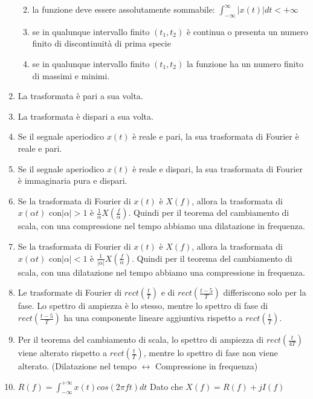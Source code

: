 \documentclass[
]{article}
\providecommand{\tightlist}{%
  \setlength{\itemsep}{0pt}\setlength{\parskip}{0pt}}
\begin{document}
\begin{enumerate}
  \begin{enumerate}
  \def\labelenumii{\arabic{enumii}.}
  \tightlist
  \item
    la funzione deve essere assolutamente sommabile:
    \(\displaystyle \int_{-\infty}^{\infty} |x(t)| dt < +\infty\)
  \item
    se in qualunque intervallo finito \((t_1, t_2)\) è continua o
    presenta un numero finito di discontinuità di prima specie
  \item
    se in qualunque intervallo finito \((t_1, t_2)\) la funzione ha un
    numero finito di massimi e minimi.
  \end{enumerate}
\item
  La trasformata è pari a sua volta.
\item
  La trasformata è dispari a sua volta.
\item
  Se il segnale aperiodico \(x(t)\) è reale e pari, la sua trasformata
  di Fourier è reale e pari.
\item
  Se il segnale aperiodico \(x(t)\) è reale e dispari, la sua
  trasformata di Fourier è immaginaria pura e dispari.
\item
  Se la trasformata di Fourier di \(x(t)\) è \(X(f)\), allora la
  trasformata di \(x(\alpha t)\) con\(|\alpha| > 1\) è
  \(\displaystyle \frac{1}{\alpha} X(\frac{f}{\alpha})\). Quindi per il
  teorema del cambiamento di scala, con una compressione nel tempo
  abbiamo una dilatazione in frequenza.
\item
  Se la trasformata di Fourier di \(x(t)\) è \(X(f)\), allora la
  trasformata di \(x(\alpha t)\) con\(|\alpha| < 1\) è
  \(\displaystyle \frac{1}{|\alpha|} X(\frac{f}{\alpha})\). Quindi per
  il teorema del cambiamento di scala, con una dilatazione nel tempo
  abbiamo una compressione in frequenza.
\item
  Le trasformate di Fourier di \(rect (\frac{t}{T})\) e di
  \(rect (\frac{t-5}{T})\) differiscono solo per la fase. Lo spettro di
  ampiezza è lo stesso, mentre lo spettro di fase di
  \(rect (\frac{t-5}{T})\) ha una componente lineare aggiuntiva rispetto
  a \(rect (\frac{t}{T})\).
\item
  Per il teorema del cambiamento di scala, lo spettro di ampiezza di
  \(rect(\frac{t}{4T})\) viene alterato rispetto a
  \(rect(\frac{t}{T})\), mentre lo spettro di fase non viene alterato.
  (Dilatazione nel tempo \(\leftrightarrow\) Compressione in frequenza)
\item
  \(\displaystyle R(f) = \int_{- \infty}^{+\infty} x(t) cos(2\pi ft)dt\)
  Dato che \(\displaystyle X(f) = R(f)+ jI(f)\)

\end{enumerate}
\end{document}
